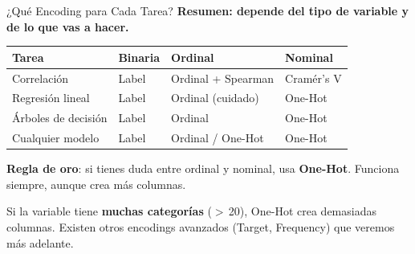 \documentclass[aspectratio=169, 11pt]{beamer}
\begin{document}
\begin{frame}[shrink=8]{¿Qué Encoding para Cada Tarea?}
  \vspace{-4pt}
  {\footnotesize\color{arcaDark}\bfseries
    Resumen: depende del tipo de variable \textbf{y} de lo que vas a hacer.}

  \vspace{6pt}
  {\scriptsize
  \begin{tabular}{@{}llll@{}}
    \toprule
    \textbf{Tarea} & \textbf{Binaria} & \textbf{Ordinal} & \textbf{Nominal} \\
    \midrule
    Correlación & Label & Ordinal + Spearman & Cramér's V \\
    Regresión lineal & Label & \color{codeOrange}Ordinal (cuidado) & One-Hot \\
    Árboles de decisión & Label & Ordinal & One-Hot \\
    Cualquier modelo & Label & Ordinal / One-Hot & One-Hot \\
    \bottomrule
  \end{tabular}
  }

  \vspace{8pt}
  {\footnotesize\color{arcaDark}
    \faLightbulb\hspace{4pt}
    \textbf{Regla de oro}: si tienes duda entre ordinal y nominal,
    usa \textbf{One-Hot}. Funciona siempre, aunque crea más columnas.}

  \vspace{4pt}
  {\footnotesize\color{arcaDark}
    \faExclamationTriangle\hspace{4pt}
    Si la variable tiene \textbf{muchas categorías} ($>$\,20),
    One-Hot crea demasiadas columnas. Existen otros encodings
    avanzados (Target, Frequency) que veremos más adelante.}
\end{frame}
\end{document}
